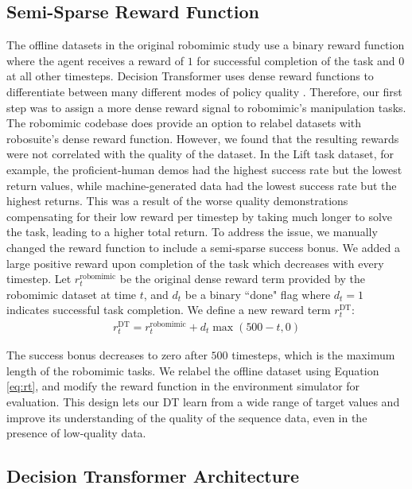 \subsection{Semi-Sparse Reward Function}
The offline datasets in the original robomimic study use a binary reward function where the agent receives a reward of $1$ for successful completion of the task and $0$ at all other timesteps. Decision Transformer uses dense reward functions to differentiate between many different modes of policy quality \cite{decisiontransformer}. Therefore, our first step was to assign a more dense reward signal to robomimic's manipulation tasks. The robomimic codebase does provide an option to relabel datasets with robosuite's dense reward function. However, we found that the resulting rewards were not correlated with the quality of the dataset. In the Lift task dataset, for example, the proficient-human demos had the highest success rate but the lowest return values, while machine-generated data had the lowest success rate but the highest returns. This was a result of the worse quality demonstrations compensating for their low reward per timestep by taking much longer to solve the task, leading to a higher total return. To address the issue, we manually changed the reward function to include a semi-sparse success bonus. We added a large positive reward upon completion of the task which decreases with every timestep. Let $r_t^{\text{robomimic}}$ be the original dense reward term provided by the robomimic dataset at time $t$, and $d_t$ be a binary ``done" flag where $d_t = 1$ indicates successful task completion. We define a new reward term $r_t^{\text{DT}}$:
\vspace{-2.5mm}
\begin{align}
    r_t^{\text{DT}} = r_t^{\text{robomimic}} + d_t \max(500 - t, 0) 
    \label{eq:rt}
\end{align}

The success bonus decreases to zero after $500$ timesteps, which is the maximum length of the robomimic tasks. We relabel the offline dataset using Equation \ref{eq:rt}, and modify the reward function in the environment simulator for evaluation. This design lets our DT learn from a wide range of target values and improve its understanding of the quality of the sequence data, even in the presence of low-quality data.

\subsection{Decision Transformer Architecture}

